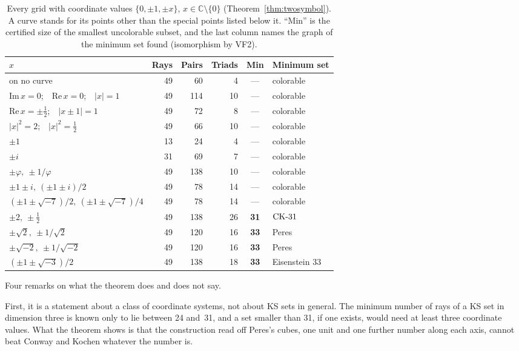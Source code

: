 \begin{table}[t]
\centering
\caption{Every grid with coordinate values $\{0,\pm1,\pm x\}$, $x\in\mathbb{C}\setminus\{0\}$
(Theorem~\ref{thm:twosymbol}).  A curve stands for its points other than the special points
listed below it.  ``Min'' is the certified size of the smallest uncolorable subset, and the last
column names the graph of the minimum set found (isomorphism by VF2).}
\label{tab:twosymbol}
\small
\begin{tabular}{@{}lrrrcl@{}}
\toprule
$x$ & Rays & Pairs & Triads & Min & Minimum set \\
\midrule
on no curve & 49 & 60 & 4 & --- & colorable \\
$\mathrm{Im}\,x=0$;\ \ $\mathrm{Re}\,x=0$;\ \ $|x|=1$ & 49 & 114 & 10 & --- & colorable \\
$\mathrm{Re}\,x=\pm\tfrac12$;\ \ $|x\pm1|=1$ & 49 & 72 & 8 & --- & colorable \\
$|x|^2=2$;\ \ $|x|^2=\tfrac12$ & 49 & 66 & 10 & --- & colorable \\
\midrule
$\pm1$ & 13 & 24 & 4 & --- & colorable \\
$\pm i$ & 31 & 69 & 7 & --- & colorable \\
$\pm\varphi,\ \pm1/\varphi$ & 49 & 138 & 10 & --- & colorable \\
$\pm1\pm i,\ (\pm1\pm i)/2$ & 49 & 78 & 14 & --- & colorable \\
$(\pm1\pm\sqrt{-7})/2,\ (\pm1\pm\sqrt{-7})/4$ & 49 & 78 & 14 & --- & colorable \\
$\pm2,\ \pm\tfrac12$ & 49 & 138 & 26 & \textbf{31} & $\mathrm{CK}\text{-}31$ \\
$\pm\sqrt2,\ \pm1/\sqrt2$ & 49 & 120 & 16 & \textbf{33} & Peres \\
$\pm\sqrt{-2},\ \pm1/\sqrt{-2}$ & 49 & 120 & 16 & \textbf{33} & Peres \\
$(\pm1\pm\sqrt{-3})/2$ & 49 & 138 & 18 & \textbf{33} & Eisenstein 33 \\
\bottomrule
\end{tabular}
\end{table}

Four remarks on what the theorem does and does not say.

First, it is a statement about a class of coordinate systems, not about KS sets in general.
The minimum number of rays of a KS set in dimension three is known only to lie between 24
and~31, and a set smaller than 31, if one exists, would need at least three coordinate values.  What the theorem
shows is that the construction read off Peres's cubes, one unit and one further number along
each axis, cannot beat Conway and Kochen whatever the number is.

